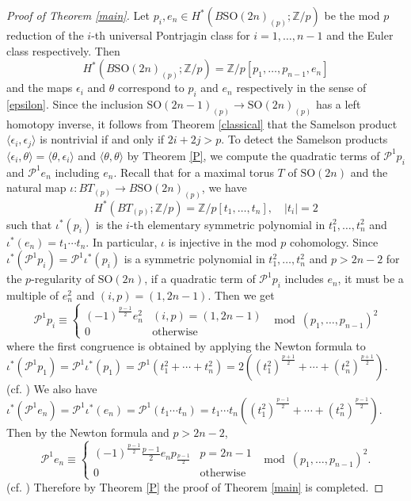 \documentclass[12pt]{amsart}
\numberwithin{equation}{section}
\theoremstyle{definition}
\theoremstyle{remark}
\begin{document}
\begin{proof}
[Proof of Theorem \ref{main}]
Let $p_i,e_n\in H^*(B{\mathrm{SO}}(2n)_{(p)};{\mathbb{Z}}/p)$ be the mod $p$ reduction of the $i$-th universal Pontrjagin class for $i=1,\ldots,n-1$ and the Euler class respectively. Then 
$$H^*(B{\mathrm{SO}}(2n)_{(p)};{\mathbb{Z}}/p)={\mathbb{Z}}/p[p_1,\ldots,p_{n-1},e_n]$$
and the maps $\epsilon_i$ and $\theta$ correspond to $p_i$ and $e_n$ respectively in the sense of \eqref{epsilon}. Since the inclusion ${\mathrm{SO}}(2n-1)_{(p)}\to{\mathrm{SO}}(2n)_{(p)}$ has a left homotopy inverse, it follows from Theorem \ref{classical} that the Samelson product $\langle\epsilon_i,\epsilon_j\rangle$ is nontrivial if and only if $2i+2j>p$. To detect the Samelson products $\langle\epsilon_i,\theta\rangle=\langle\theta,\epsilon_i\rangle$ and $\langle\theta,\theta\rangle$ by Theorem \ref{P}, we compute the quadratic terms of $\mathcal{P}^1p_i$ and $\mathcal{P}^1e_n$ including $e_n$. Recall that for a maximal torus $T$ of ${\mathrm{SO}}(2n)$ and the natural map $\iota:BT_{(p)}\to B{\mathrm{SO}}(2n)_{(p)}$, we have
$$H^*(BT_{(p)};{\mathbb{Z}}/p)={\mathbb{Z}}/p[t_1,\ldots,t_n],\quad|t_i|=2$$
such that $\iota^*(p_i)$ is the $i$-th elementary symmetric polynomial in $t_1^2,\ldots,t_n^2$ and $\iota^*(e_n)=t_1\cdots t_n$. In particular, $\iota$ is injective in the mod $p$ cohomology. Since $\iota^*(\mathcal{P}^1p_i)=\mathcal{P}^1\iota^*(p_i)$ is a symmetric polynomial in $t_1^2,\ldots,t_n^2$ and $p>2n-2$ for the $p$-regularity of ${\mathrm{SO}}(2n)$, if a quadratic term of $\mathcal{P}^1p_i$ includes $e_n$, it must be a multiple of $e_n^2$ and $(i,p)=(1,2n-1)$. Then we get
$$\mathcal{P}^1p_i\equiv\begin{cases}(-1)^{\frac{p-1}{2}}e_n^2&(i,p)=(1,2n-1)\\0&\text{otherwise}\end{cases}\mod(p_1,\ldots,p_{n-1})^2$$
where the first congruence is obtained by applying the Newton formula to $\iota^*(\mathcal{P}^1p_1)=\mathcal{P}^1\iota^*(p_1)=\mathcal{P}^1(t_1^2+\cdots+t_n^2)=2((t_1^2)^{\frac{p+1}{2}}+\cdots+(t_n^2)^{\frac{p+1}{2}})$. (cf. \cite{Ma}) We also have $\iota^*(\mathcal{P}^1e_n)=\mathcal{P}^1\iota^*(e_n)=\mathcal{P}^1(t_1\cdots t_n)=t_1\cdots t_n((t_1^2)^{\frac{p-1}{2}}+\cdots+(t_n^2)^{\frac{p-1}{2}})$. Then by the Newton formula and $p>2n-2$, 
$$\mathcal{P}^1e_n\equiv\begin{cases}(-1)^{\frac{p-1}{2}}\tfrac{p-1}{2}e_np_{\frac{p-1}{2}}&p=2n-1\\0&\text{otherwise}\end{cases}\mod(p_1,\ldots,p_{n-1})^2.$$
(cf. \cite{HK1}) Therefore by Theorem \ref{P} the proof of Theorem \ref{main} is completed.
\end{proof}
\end{document}
